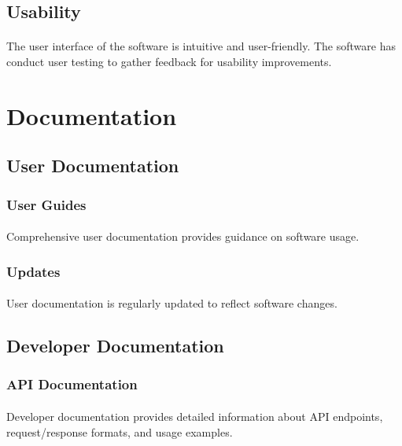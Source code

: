 \documentclass{article}
\begin{document}
\subsection{Usability}
\paragraph{}
The user interface of the software is intuitive and user-friendly. The software has
conduct user testing to gather feedback for usability improvements.


\section{Documentation}
\subsection{User Documentation}
\subsubsection{User Guides}
\paragraph{}
Comprehensive user documentation provides guidance on software usage.

\subsubsection{Updates}
\paragraph{}
User documentation is regularly updated to reflect software changes.

\subsection{Developer Documentation}
\subsubsection{API Documentation}
\paragraph{}
Developer documentation provides detailed information about API endpoints,
request/response formats, and usage examples.
\end{document}
